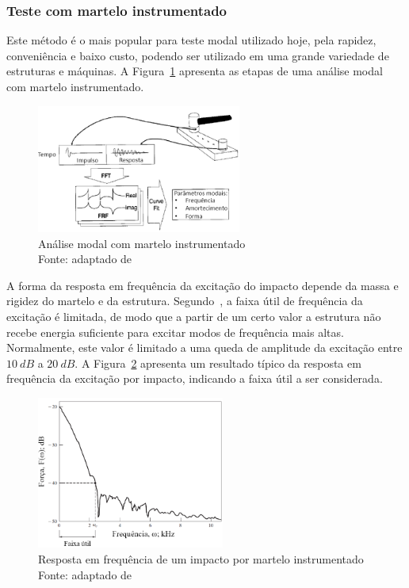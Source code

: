 \subsubsection{Teste com martelo instrumentado}

Este método é o mais popular para teste modal utilizado hoje, pela rapidez,
conveniência e baixo custo, podendo ser utilizado em uma grande variedade de
estruturas e máquinas. A Figura~\ref{fig::impact_testing} apresenta as etapas de
uma análise modal com martelo instrumentado.

\begin{figure}[h]
	\centering 
 	\includegraphics[width=0.60\textwidth]{figs/impact_testing}
 	\caption[Análise modal com martelo instrumentado]{Análise modal com martelo
 	instrumentado \\
 	Fonte: adaptado de \cite{schwarz1999experimental}}
 	\label{fig::impact_testing}
\end{figure}

A forma da resposta em frequência da excitação do impacto depende da massa e
rigidez do martelo e da estrutura. Segundo~\citet{rao2011mechanical}, a faixa
útil de frequência da excitação é limitada, de modo que a partir de um certo
valor a estrutura não recebe energia suficiente para excitar modos de frequência
mais altas. Normalmente, este valor é limitado a uma queda de amplitude da
excitação entre $10~dB$ a $20~dB$. A Figura~\ref{fig::range_hammer}
apresenta um resultado típico da resposta em frequência da excitação por impacto, indicando a
faixa útil a ser considerada.

\begin{figure}[h]
	\centering 
 	\includegraphics[width=0.55\textwidth]{figs/range_hammer}
 	\caption[Resposta em frequência de um impacto por martelo
 	instrumentado]{Resposta em frequência de um impacto por martelo
 	instrumentado \\
 	Fonte: adaptado de \cite{rao2011mechanical}}
 	\label{fig::range_hammer}
\end{figure}


